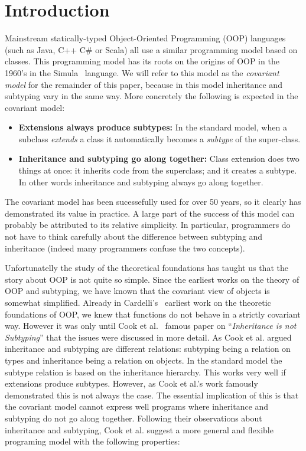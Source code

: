 \section{Introduction}

Mainstream statically-typed Object-Oriented Programming (OOP) languages (such as Java,
C++ C\# or Scala) all use a similar programming model based on
classes. This programming model has its roots on the
origins of OOP in the 1960's in the Simula~\cite{} language. 
We will refer to this model as the \emph{covariant model} for the
remainder of this paper, because in this model inheritance and
subtyping vary in the same way. More concretely
the following is expected in the covariant model:

\begin{itemize}

\item {\bf Extensions always produce subtypes:} In the standard model, when a 
subclass \emph{extends} a class it automatically becomes a 
\emph{subtype} of the super-class. 

\item{\bf Inheritance and subtyping go along together:}
Class extension does two things at once: it inherits code from the
superclass; and it creates a subtype. In other words inheritance and
subtyping always go along together. 

\end{itemize}

The covariant model has been sucessefully used for over 50 years,
so it clearly has demonstrated its value in practice. 
A large part of the success of this model can probably be attributed 
to its relative simplicity. In particular, programmers do not have to think carefully 
about the difference between subtyping and inheritance (indeed many
programmers confuse the two concepts). 

Unfortunatelly the study of the theoretical foundations has
taught us that the story about OOP is not quite so simple. Since the
earliest works on the theory of OOP and subtyping, we have known that 
the covariant view of objects is somewhat simplified. Already in
Cardelli's~\cite{} earliest work on the theoretic foundations of OOP,
we knew that functions do not behave in a strictly covariant way. 
However it was only until Cook et al.~\cite{} famous paper on
``\emph{Inheritance is not Subtyping}'' that the issues were discussed 
in more detail. As Cook et al. argued inheritance and
subtyping are different relations: subtyping being a relation on types 
and inheritance being a relation on objects. In the standard model 
the subtype relation is based on the inheritance hierarchy. This 
works very well if extensions produce 
subtypes. However, as Cook et al.'s work famously demonstrated 
this is not always the case. The essential implication of this is that
the covariant model cannot express well programs where inheritance 
and subtyping do not go along together. Following their observations about 
inheritance and subtyping, Cook et al. suggest a more general and 
flexible programing model with the following properties:

